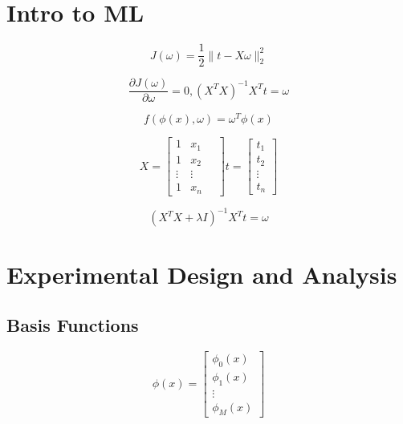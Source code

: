 \documentclass[10pt]{article}
\begin{document}
\begin{multicols}{2}
\section*{Intro to ML}
\begin{equation}
    J(\omega) = \frac{1}{2} \lVert{t - X\omega} \rVert^{2}_{2}
\end{equation}

\begin{equation}
    \frac{\partial J(\omega)}{\partial \omega} = 0, (X^{T}X)^{-1}X^{T}t = \omega
\end{equation}

\begin{equation}
    \label{eq:mapper}
    f(\phi(x), \omega) = \omega^{T}\phi(x)
\end{equation}

\begin{equation} \label{eq:feature-target}
    X = \begin{bmatrix} 
    1 & x_{1} \\
    1 & x_{2} \\
    \vdots & \vdots \\
    1 & x_{n}
    \quad
    \end{bmatrix}
    t = \begin{bmatrix}
    t_{1} \\
    t_{2} \\
    \vdots \\
    t_{n}
    \end{bmatrix}
\end{equation}

\begin{equation}
    \label{eq:ridge}
    (X^{T}X + \lambda I)^{-1}X^{T}t = \omega
\end{equation}

\section*{Experimental Design and Analysis}
\subsection*{Basis Functions}

\begin{equation}
    \phi(x) = \begin{bmatrix}
    \phi_{0}(x) \\
    \phi_{1}(x) \\
    \vdots \\
    \phi_{M}(x)
    \end{bmatrix}
\end{equation}


\end{multicols}
\end{document}
